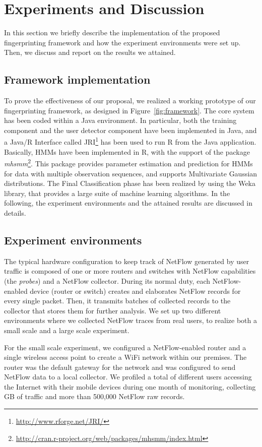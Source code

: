 \documentclass[10pt,conference,compsocconf,letterpaper]{IEEEtran}
\begin{document}
\section{Experiments and Discussion}
\label{sec:experimentsDescription}
In this section we briefly describe the implementation of the proposed
fingerprinting framework and how the experiment environments were set up. Then,
we discuss and report on the results we attained.

\subsection{Framework implementation}
To prove the effectiveness of our proposal, we realized a working
prototype of our fingerprinting framework, as designed in
Figure~\ref{fig:framework}. The core system has been coded within a
Java environment.  In particular, both the
training component and the user detector component have been implemented in Java,
and a Java/R Interface called
JRI\footnote{\small \url{http://www.rforge.net/JRI/}} has been used to run R
from the Java application.  Basically, HMMs have been implemented in R, 
with the support of the package
\emph{mhsmm}\footnote{\small \url{http://cran.r-project.org/web/packages/mhsmm/index.html}}.
This package provides parameter estimation and prediction for HMMs for
data with multiple observation sequences, and supports Multivariate
Gaussian distributions.  The Final
Classification phase has been realized by using the Weka library,
that provides a large suite of machine learning algorithms.  In the
following, the experiment environments and the attained results are
discussed in details.

\subsection{Experiment environments}
\label{sec:expenvironments}
The typical hardware configuration to keep track of NetFlow generated
by user traffic is composed of one or more routers and switches with
NetFlow capabilities (the \textit{probes}) and a NetFlow
collector. During its normal duty, each NetFlow-enabled device (router
or switch) creates and elaborates NetFlow records for every single
packet. Then, it transmits  batches of collected
records to the collector that stores them for further
analysis.  We set up two different environments where we collected NetFlow traces
from real users, to realize both a small scale and a large scale
experiment.

For the small scale experiment, we configured a NetFlow-enabled router
and a single wireless access point to create a WiFi network within our premises. 
The router was the default gateway for the network and was configured to send NetFlow data
to a local collector. We profiled a total of  different
users accessing the Internet with their mobile devices during one
month of monitoring, collecting  GB of traffic and more than 
500,000 NetFlow raw records.
\end{document}
